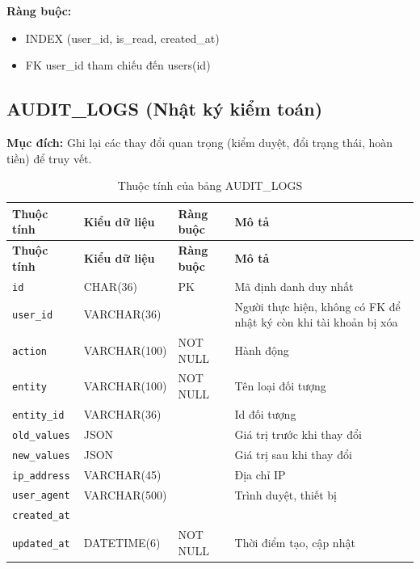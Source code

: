 \textbf{Ràng buộc:}
\begin{itemize}
    \item INDEX (user\_\allowbreak{}id, is\_\allowbreak{}read, created\_\allowbreak{}at)
    \item FK user\_\allowbreak{}id tham chiếu đến users(id)
\end{itemize}

\subsection{AUDIT\_\allowbreak{}LOGS (Nhật ký kiểm toán)}

\textbf{Mục đích:} Ghi lại các thay đổi quan trọng (kiểm duyệt, đổi trạng thái, hoàn tiền) để truy vết.

{\small
\begin{longtable}{|P{3.2cm}|P{2.8cm}|P{2.2cm}|p{5.4cm}|}
    \caption{Thuộc tính của bảng AUDIT\_\allowbreak{}LOGS}
    \label{tab:audit_logs} \\
    \hline
    \textbf{Thuộc tính} & \textbf{Kiểu dữ liệu} & \textbf{Ràng buộc} & \textbf{Mô tả} \\
    \hline
    \endfirsthead
    \hline
    \textbf{Thuộc tính} & \textbf{Kiểu dữ liệu} & \textbf{Ràng buộc} & \textbf{Mô tả} \\
    \hline
    \endhead

    \texttt{id} & CHAR(36) & PK & Mã định danh duy nhất \\
    \hline
    \texttt{user\_\allowbreak{}id} & VARCHAR(36) &  & Người thực hiện, không có FK để nhật ký còn khi tài khoản bị xóa \\
    \hline
    \texttt{action} & VARCHAR(100) & NOT NULL & Hành động \\
    \hline
    \texttt{entity} & VARCHAR(100) & NOT NULL & Tên loại đối tượng \\
    \hline
    \texttt{entity\_\allowbreak{}id} & VARCHAR(36) &  & Id đối tượng \\
    \hline
    \texttt{old\_\allowbreak{}values} & JSON &  & Giá trị trước khi thay đổi \\
    \hline
    \texttt{new\_\allowbreak{}values} & JSON &  & Giá trị sau khi thay đổi \\
    \hline
    \texttt{ip\_\allowbreak{}address} & VARCHAR(45) &  & Địa chỉ IP \\
    \hline
    \texttt{user\_\allowbreak{}agent} & VARCHAR(500) &  & Trình duyệt, thiết bị \\
    \hline
    \texttt{created\_\allowbreak{}at} &  &  &  \\
    \hline
    \texttt{updated\_\allowbreak{}at} & DATETIME(6) & NOT NULL & Thời điểm tạo, cập nhật \\
    \hline
\end{longtable}
}

